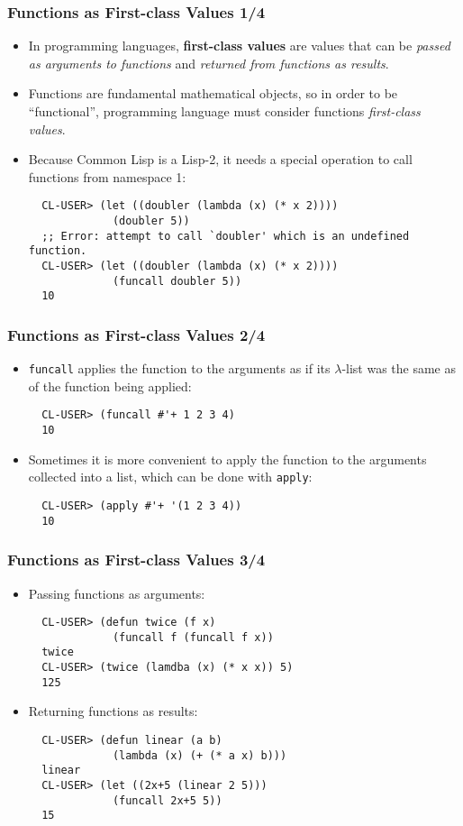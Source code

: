 \documentclass{beamer}
\begin{document}
\begin{frame}[fragile]
  \frametitle{Functions as First-class Values 1/4}
  \begin{itemize}
  \item In programming languages, \textbf{first-class values} are values that
    can be \textit{passed as arguments to functions} and \textit{returned from
      functions as results}.
  \item Functions are fundamental mathematical objects, so in order to be
    ``functional'', programming language must consider functions
    \textit{first-class values}.
  \item Because Common Lisp is a Lisp-2, it needs a special operation to call
    functions from namespace 1:
\begin{verbatim}
  CL-USER> (let ((doubler (lambda (x) (* x 2))))
             (doubler 5))
  ;; Error: attempt to call `doubler' which is an undefined function.
  CL-USER> (let ((doubler (lambda (x) (* x 2))))
             (funcall doubler 5))
  10
\end{verbatim}
  \end{itemize}
\end{frame}

\begin{frame}[fragile]
  \frametitle{Functions as First-class Values 2/4}
  \begin{itemize}
  \item \texttt{funcall} applies the function to the arguments as if
    its $\lambda$-list was the same as of the function being applied:
\begin{verbatim}
  CL-USER> (funcall #'+ 1 2 3 4)
  10
\end{verbatim}
  \item Sometimes it is more convenient to apply the function to the arguments
    collected into a list, which can be done with \texttt{apply}:
\begin{verbatim}
  CL-USER> (apply #'+ '(1 2 3 4))
  10
\end{verbatim}
  \end{itemize}
\end{frame}

\begin{frame}[fragile]
  \frametitle{Functions as First-class Values 3/4}
  \begin{itemize}
  \item Passing functions as arguments:
\begin{verbatim}
  CL-USER> (defun twice (f x)
             (funcall f (funcall f x))
  twice
  CL-USER> (twice (lamdba (x) (* x x)) 5)
  125
\end{verbatim}
  \item Returning functions as results:
\begin{verbatim}
  CL-USER> (defun linear (a b)
             (lambda (x) (+ (* a x) b)))
  linear
  CL-USER> (let ((2x+5 (linear 2 5)))
             (funcall 2x+5 5))
  15
\end{verbatim}
  \end{itemize}
\end{frame}
\end{document}

